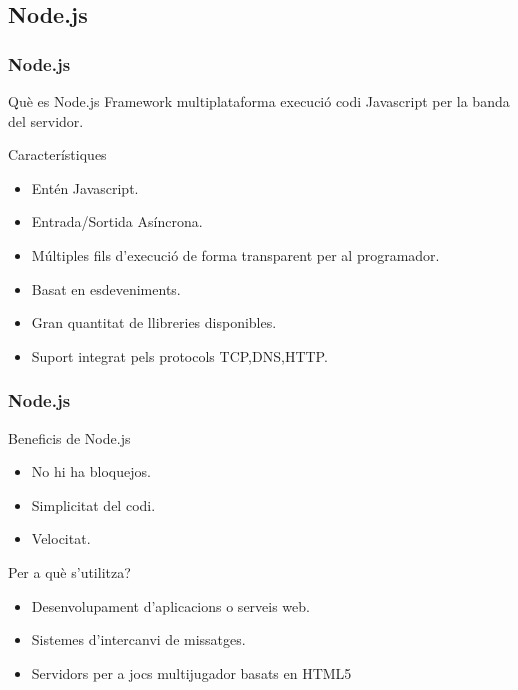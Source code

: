 \documentclass[notitlepage]{beamer}
\begin{document}
\subsection{Node.js}
\begin{frame}
\frametitle{Node.js}
\begin{block}{Què es Node.js}
Framework multiplataforma execució codi Javascript per la banda del servidor.
\end{block}

\begin{block}{Característiques}
\begin{itemize}
    \item{Entén Javascript.}
    \item{Entrada/Sortida Asíncrona.}
    \item{Múltiples fils d'execució de forma transparent per al programador.}
    \item{Basat en esdeveniments.}
    \item{Gran quantitat de llibreries disponibles.}
    \item{Suport integrat pels protocols TCP,DNS,HTTP.}
\end{itemize}
\end{block}

\end{frame}
\begin{frame}
\frametitle{Node.js}
\begin{block}{Beneficis de Node.js}
\begin{itemize}
    \item{No hi ha bloquejos.}
    \item{Simplicitat del codi.}
    \item{Velocitat.}
\end{itemize}
\end{block}
\begin{block}{Per a què s'utilitza?}
\begin{itemize}
    \item{Desenvolupament d'aplicacions o serveis web.}
    \item{Sistemes d'intercanvi de missatges.}
    \item{Servidors per a jocs multijugador basats en HTML5}
\end{itemize}
\end{block}

\end{frame}
\end{document}
